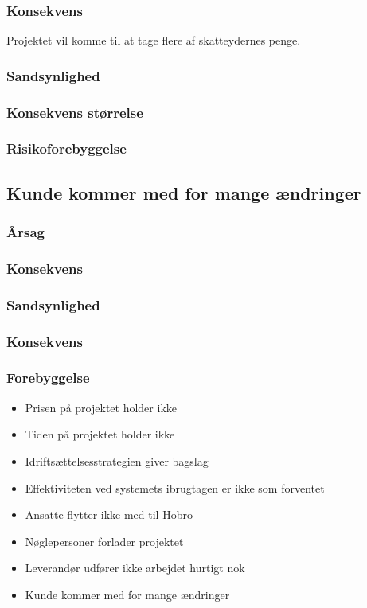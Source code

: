 \documentclass[10pt,a4paper,danish]{article}
\begin{document}
\subsubsection{Konsekvens}
Projektet vil komme til at tage flere af skatteydernes penge.
\subsubsection{Sandsynlighed}

\subsubsection{Konsekvens størrelse}

\subsubsection{Risikoforebyggelse}


\subsection{Kunde kommer med for mange ændringer}
\subsubsection{Årsag}


\subsubsection{Konsekvens}


\subsubsection{Sandsynlighed}


\subsubsection{Konsekvens}


\subsubsection{Forebyggelse}


\begin{itemize}
\item Prisen på projektet holder ikke
\item Tiden på projektet holder ikke
\item Idriftsættelsesstrategien giver bagslag
\item Effektiviteten ved systemets ibrugtagen er ikke som forventet
\item Ansatte flytter ikke med til Hobro 
\item Nøglepersoner forlader projektet
\item Leverandør udfører ikke arbejdet hurtigt nok
\item Kunde kommer med for mange ændringer
\end{itemize}
\end{document}

